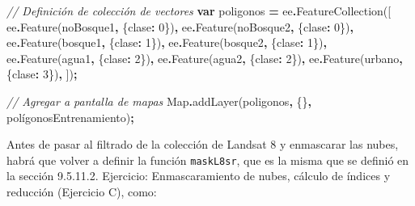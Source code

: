 \documentclass[
  12pt,
  letterpaper,
  twoside]{book}
\newenvironment{Shaded}{\begin{snugshade}}{\end{snugshade}}
\newcommand{\BuiltInTok}[1]{#1}
\newcommand{\CommentTok}[1]{\textcolor[rgb]{0.56,0.35,0.01}{\textit{#1}}}
\newcommand{\DecValTok}[1]{\textcolor[rgb]{0.00,0.00,0.81}{#1}}
\newcommand{\FunctionTok}[1]{\textcolor[rgb]{0.00,0.00,0.00}{#1}}
\newcommand{\KeywordTok}[1]{\textcolor[rgb]{0.13,0.29,0.53}{\textbf{#1}}}
\newcommand{\NormalTok}[1]{#1}
\newcommand{\OperatorTok}[1]{\textcolor[rgb]{0.81,0.36,0.00}{\textbf{#1}}}
\newcommand{\StringTok}[1]{\textcolor[rgb]{0.31,0.60,0.02}{#1}}
\begin{document}
\begin{Shaded}
\begin{Highlighting}[]
\CommentTok{// Definición de colección de vectores}
\KeywordTok{var}\NormalTok{ poligonos }\OperatorTok{=}\NormalTok{ ee}\OperatorTok{.}\FunctionTok{FeatureCollection}\NormalTok{([}
\NormalTok{  ee}\OperatorTok{.}\FunctionTok{Feature}\NormalTok{(noBosque1}\OperatorTok{,}\NormalTok{ \{}\StringTok{\textquotesingle{}clase\textquotesingle{}}\OperatorTok{:} \DecValTok{0}\NormalTok{\})}\OperatorTok{,}
\NormalTok{  ee}\OperatorTok{.}\FunctionTok{Feature}\NormalTok{(noBosque2}\OperatorTok{,}\NormalTok{ \{}\StringTok{\textquotesingle{}clase\textquotesingle{}}\OperatorTok{:} \DecValTok{0}\NormalTok{\})}\OperatorTok{,}
\NormalTok{  ee}\OperatorTok{.}\FunctionTok{Feature}\NormalTok{(bosque1}\OperatorTok{,}\NormalTok{ \{}\StringTok{\textquotesingle{}clase\textquotesingle{}}\OperatorTok{:} \DecValTok{1}\NormalTok{\})}\OperatorTok{,}
\NormalTok{  ee}\OperatorTok{.}\FunctionTok{Feature}\NormalTok{(bosque2}\OperatorTok{,}\NormalTok{ \{}\StringTok{\textquotesingle{}clase\textquotesingle{}}\OperatorTok{:} \DecValTok{1}\NormalTok{\})}\OperatorTok{,}
\NormalTok{  ee}\OperatorTok{.}\FunctionTok{Feature}\NormalTok{(agua1}\OperatorTok{,}\NormalTok{ \{}\StringTok{\textquotesingle{}clase\textquotesingle{}}\OperatorTok{:} \DecValTok{2}\NormalTok{\})}\OperatorTok{,}
\NormalTok{  ee}\OperatorTok{.}\FunctionTok{Feature}\NormalTok{(agua2}\OperatorTok{,}\NormalTok{ \{}\StringTok{\textquotesingle{}clase\textquotesingle{}}\OperatorTok{:} \DecValTok{2}\NormalTok{\})}\OperatorTok{,}
\NormalTok{  ee}\OperatorTok{.}\FunctionTok{Feature}\NormalTok{(urbano}\OperatorTok{,}\NormalTok{ \{}\StringTok{\textquotesingle{}clase\textquotesingle{}}\OperatorTok{:} \DecValTok{3}\NormalTok{\})}\OperatorTok{,}
\NormalTok{])}\OperatorTok{;}

\CommentTok{// Agregar a pantalla de mapas}
\BuiltInTok{Map}\OperatorTok{.}\FunctionTok{addLayer}\NormalTok{(poligonos}\OperatorTok{,}\NormalTok{ \{\}}\OperatorTok{,} \StringTok{\textquotesingle{}polígonosEntrenamiento\textquotesingle{}}\NormalTok{)}\OperatorTok{;}
\end{Highlighting}
\end{Shaded}

Antes de pasar al filtrado de la colección de Landsat 8 y enmascarar las nubes, habrá que volver a definir la función \texttt{maskL8sr}, que es la misma que se definió en la sección 9.5.11.2. Ejercicio: Enmascaramiento de nubes, cálculo de índices y reducción (Ejercicio C), como:
\end{document}
